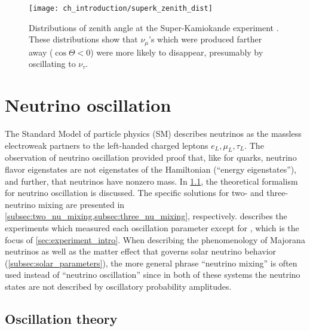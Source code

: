 \begin{figure}
    \centering
    \texttt{[image: ch\_introduction/superk\_zenith\_dist]}
    \caption[Super-Kamiokande zenith angle distribution]{
        Distributions of zenith angle at the Super-Kamiokande experiment
        \cite{superk1998}.
        These distributions show that $\nu_\mu$'s which were produced farther away
        ($\cos\Theta < 0$)
        were more likely to disappear, presumably by oscillating to $\nu_\tau$.
    }
    \label{fig:superk_zenith}
\end{figure}


\section{Neutrino oscillation}
\label{sec:osc_intro}

The Standard Model of particle physics (SM)
describes neutrinos as the massless electroweak partners
to the left-handed charged leptons $e_L,\mu_L,\tau_L$.
The observation of neutrino oscillation provided proof that,
like for quarks, neutrino flavor eigenstates are not
eigenstates of the Hamiltonian (``energy eigenstates''),
and further, that neutrinos have nonzero mass.
In \cref{subsec:theory}, the theoretical formalism for neutrino oscillation is discussed.
The specific solutions for two- and three-neutrino mixing
are presented in \cref{subsec:two_nu_mixing,subsec:three_nu_mixing},
respectively.
 describes the experiments which measured
each oscillation parameter
except for \thetaot{}, which is the focus of \cref{sec:experiment_intro}.
When describing the phenomenology of Majorana neutrinos
as well as the matter effect that governs solar neutrino behavior
(\cref{subsec:solar_parameters}),
the more general phrase ``neutrino mixing''
is often used instead of ``neutrino oscillation''
since in both of these systems
the neutrino states are not described by oscillatory probability amplitudes.

\subsection{Oscillation theory}
\label{subsec:theory}

